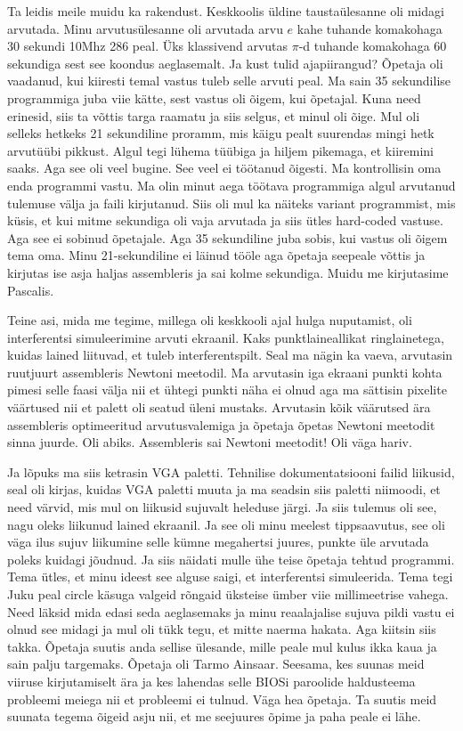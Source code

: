 Ta leidis meile muidu ka rakendust. Keskkoolis üldine taustaülesanne oli midagi arvutada. Minu arvutusülesanne oli arvutada arvu $e$ kahe tuhande komakohaga 30 sekundi 10Mhz 286 peal. Üks klassivend arvutas $\pi$-d tuhande komakohaga 60 sekundiga sest see koondus aeglasemalt. Ja kust tulid ajapiirangud? Õpetaja oli vaadanud, kui kiiresti temal vastus tuleb selle arvuti peal. Ma sain 35 sekundilise programmiga juba viie kätte, sest vastus oli õigem, kui õpetajal. Kuna need erinesid, siis ta võttis targa raamatu ja siis selgus, et minul oli õige. Mul oli selleks hetkeks 21 sekundiline proramm, mis käigu pealt suurendas mingi hetk arvutüübi pikkust. Algul tegi lühema tüübiga ja hiljem pikemaga, et kiiremini saaks. Aga see oli veel bugine. See veel ei töötanud õigesti. Ma kontrollisin oma enda programmi vastu. Ma olin minut aega töötava programmiga algul arvutanud tulemuse välja ja faili kirjutanud. Siis oli mul ka näiteks variant programmist, mis küsis, et kui mitme sekundiga oli vaja arvutada ja siis ütles hard-coded vastuse. Aga see ei sobinud õpetajale. Aga 35 sekundiline juba sobis, kui vastus oli õigem tema oma.  Minu 21-sekundiline ei läinud tööle aga õpetaja seepeale võttis ja kirjutas ise asja haljas assembleris ja sai kolme sekundiga. Muidu me kirjutasime Pascalis. 

Teine asi, mida me tegime, millega oli keskkooli ajal hulga nuputamist, oli interferentsi simuleerimine arvuti ekraanil. Kaks punktlaineallikat ringlainetega, kuidas lained liituvad, et tuleb interferentspilt. Seal ma nägin ka vaeva, arvutasin ruutjuurt assembleris Newtoni meetodil. Ma arvutasin iga ekraani punkti kohta pimesi selle faasi välja nii et ühtegi punkti näha ei olnud aga ma sättisin pixelite väärtused nii et palett oli seatud üleni mustaks. Arvutasin kõik väärutsed ära assembleris optimeeritud arvutusvalemiga ja õpetaja õpetas Newtoni meetodit sinna juurde. Oli abiks. Assembleris sai Newtoni meetodit! Oli väga hariv. 

Ja lõpuks ma siis ketrasin VGA paletti. Tehnilise dokumentatsiooni failid liikusid, seal oli kirjas, kuidas VGA paletti muuta ja ma seadsin siis paletti niimoodi, et need värvid, mis mul on liikusid sujuvalt heleduse järgi. Ja siis tulemus oli see, nagu oleks liikunud lained ekraanil. Ja see oli minu meelest tippsaavutus, see oli väga ilus sujuv liikumine selle kümne megahertsi juures, punkte üle arvutada poleks kuidagi jõudnud. Ja siis näidati mulle ühe teise õpetaja tehtud programmi. Tema ütles, et minu ideest see alguse saigi, et interferentsi simuleerida. Tema tegi Juku peal circle käsuga valgeid rõngaid üksteise ümber viie millimeetrise vahega. Need läksid mida edasi seda aeglasemaks ja minu reaalajalise sujuva pildi vastu ei olnud see midagi ja mul oli tükk tegu, et mitte naerma hakata. Aga kiitsin siis takka. Õpetaja suutis anda sellise ülesande, mille peale mul kulus ikka kaua ja sain palju targemaks. Õpetaja oli Tarmo Ainsaar. Seesama, kes suunas meid viiruse kirjutamiselt ära ja kes lahendas selle BIOSi paroolide haldusteema probleemi meiega nii et probleemi ei tulnud. Väga hea õpetaja. Ta suutis meid suunata tegema õigeid asju nii, et me seejuures õpime ja paha peale ei lähe. 

